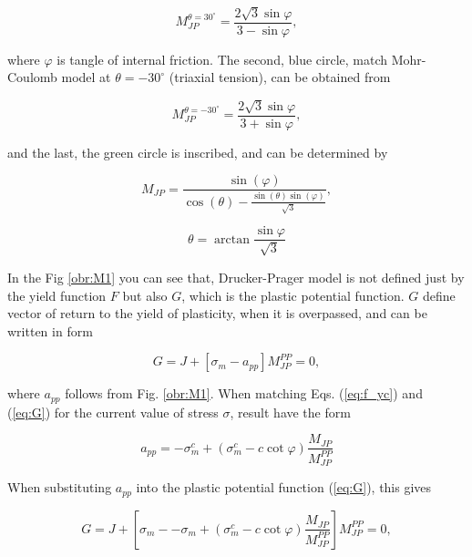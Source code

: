 \begin{equation}\label{eq:f_Mjp_30}
	M_{JP}^{\theta=30^\circ} = \dfrac{2\sqrt{3}\sin\varphi}{3-\sin \varphi},
\end{equation}

where $\varphi$ is tangle of internal friction. The second, blue circle, match Mohr-Coulomb model at  $\theta = -30^\circ$ (triaxial tension), can be obtained from

\begin{equation}\label{eq:f_Mjp_-30}
	M_{JP}^{\theta=-30^\circ} = \dfrac{2\sqrt{3}\sin\varphi}{3+\sin \varphi},
\end{equation}

and the last, the green circle is inscribed, and can be determined by

\begin{equation}\label{eq:f_Mjp_i}
	M_{JP} = \dfrac{\sin(\varphi)}{\cos(\theta)-\frac{\sin(\theta)\sin(\varphi)}{\sqrt{3}}},
\end{equation}

\begin{equation}\label{eq:f_theta}
	\theta = \arctan{\frac{\sin{\varphi}}{\sqrt{3}}}
\end{equation}

In the Fig \ref{obr:M1} you can see that, Drucker-Prager model is not defined just by the yield function $F$ but also $G$, which is the plastic potential function. $G$ define vector of return to the yield of plasticity, when it is overpassed, and can be written in form 

\begin{equation}\label{eq:G}
	G = J + \left[ \sigma_m - a_{pp} \right] M_{JP}^{PP} = 0,
\end{equation}

where $a_{pp}$ follows from Fig. \ref{obr:M1}. When matching Eqs. (\ref{eq:f_yc}) and (\ref{eq:G}) for the current value of stress $\sigma$, result have the form

\begin{equation}\label{eq:app}
	a_{pp} = - \sigma_m^c + ( \sigma_m^c - c\cot\varphi) \dfrac{M_{JP}}{M_{JP}^{PP}}
\end{equation} 

When substituting $a_{pp}$ into the plastic potential function (\ref{eq:G}), this gives

\begin{equation}\label{eq:plastic_potential}
	G = J + \left[ \sigma_m - - \sigma_m + ( \sigma_m^c - c\cot\varphi) \dfrac{M_{JP}}{M_{JP}^{PP}} \right] M_{JP}^{PP} = 0,
\end{equation}

